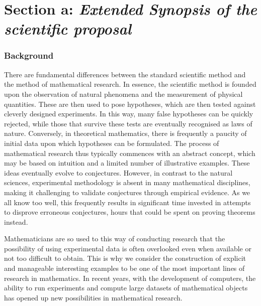 \section*{Section a: \textit{Extended Synopsis of the scientific proposal}}

\subsubsection*{Background}

There are fundamental differences between the standard scientific method and the method of mathematical research.
In essence, the scientific method is founded upon the observation of natural phenomena and the measurement of physical quantities.
These are then used to pose hypotheses, which are then tested against cleverly designed experiments.
In this way, many false hypotheses can be quickly rejected,
while those that survive these tests are eventually recognised as laws of nature.
Conversely, in theoretical mathematics, there is frequently a paucity of initial data upon which hypotheses can be formulated.
The process of mathematical research thus typically commences with an abstract concept, which may be based on intuition and a limited number of illustrative examples. 
These ideas eventually evolve to conjectures.
However, in contrast to the natural sciences, experimental methodology is absent in many mathematical disciplines, making it challenging to validate conjectures through empirical evidence.
As we all know too well, this frequently results in significant time invested in attempts to disprove erroneous conjectures, hours that could be spent on proving theorems instead.

Mathematicians are so used to this way of conducting research that the possibility of using experimental data is often overlooked even when available or not too difficult to obtain.
This is why we consider the construction of explicit and manageable interesting examples to be one of the most important lines of research in mathematics.
In recent years, with the development of computers, the ability to run experiments and compute large datasets of mathematical objects has opened up new possibilities in mathematical research.

